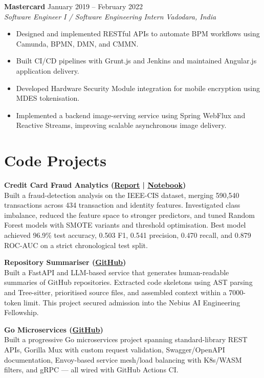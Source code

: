 \documentclass[a4paper,10pt]{article}
\newcommand{\role}[4]{
  \textbf{\color{accent}#1} \hfill {\small #2}\\
  \textit{#3} \hfill {\small \textit{#4}}
}
\newcommand{\project}[2]{
  \textbf{\color{accent}#1}\\
  {\small #2}
}
\begin{document}
\role{Mastercard}{January 2019 -- February 2022}{Software Engineer I / Software Engineering Intern}{Vadodara, India}
\begin{itemize}
  \item Designed and implemented RESTful APIs to automate BPM workflows using Camunda, BPMN, DMN, and CMMN.
  \item Built CI/CD pipelines with Grunt.js and Jenkins and maintained Angular.js application delivery.
  \item Developed Hardware Security Module integration for mobile encryption using MDES tokenisation.
  \item Implemented a backend image-serving service using Spring WebFlux and Reactive Streams, improving scalable asynchronous image delivery.
\end{itemize}

\section{Code Projects}
\project{Credit Card Fraud Analytics \small{(\href{https://github.com/aymanapatel/qmul-all-projects/blob/main/data-analytics/coursework1/credit-card-report.pdf}{Report} | \href{https://github.com/aymanapatel/qmul-all-projects/blob/main/data-analytics/coursework1/credit-card-notebook.ipynb}{Notebook})}}{Built a fraud-detection analysis on the IEEE-CIS dataset, merging 590,540 transactions across 434 transaction and identity features. Investigated class imbalance, reduced the feature space to stronger predictors, and tuned Random Forest models with SMOTE variants and threshold optimisation. Best model achieved 96.9\% test accuracy, 0.503 F1, 0.541 precision, 0.470 recall, and 0.879 ROC-AUC on a strict chronological test split.}

\vspace{2pt}
\project{Repository Summariser \small{(\href{https://github.com/aymanapatel/nebius-project}{GitHub})}}{Built a FastAPI and LLM-based service that generates human-readable summaries of GitHub repositories. Extracted code skeletons using AST parsing and Tree-sitter, prioritised source files, and assembled context within a 7000-token limit. This project secured admission into the Nebius AI Engineering Fellowship.}

\vspace{2pt}
\project{Go Microservices \small{(\href{https://github.com/aymanapatel/golang-microservices}{GitHub})}}{Built a progressive Go microservices project spanning standard-library REST APIs, Gorilla Mux with custom request validation, Swagger/OpenAPI documentation, Envoy-based service mesh/load balancing with K8s/WASM filters, and gRPC — all wired with GitHub Actions CI.}
\end{document}
